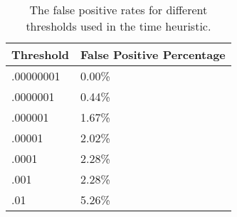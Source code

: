 \begin{table}[h]
\begin{center}
    \begin{tabular}{| l | l |}
    \hline
    Threshold & False Positive Percentage \\ \hline \hline
    .00000001 & 0.00\% \\ \hline
    .0000001 & 0.44\% \\ \hline
    .000001 & 1.67\% \\ \hline
    .00001 & 2.02\% \\ \hline
    .0001 & 2.28\% \\ \hline
    .001 & 2.28\% \\ \hline
    .01 & 5.26\% \\
    \hline
    \end{tabular}
\end{center}
\caption{The false positive rates for different thresholds used in the time heuristic.}
\label{tab:time}
\end{table}


